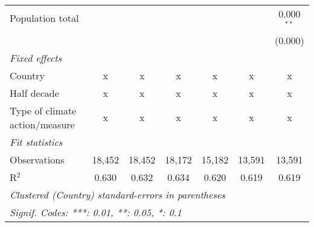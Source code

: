 \begin{tabular}{lcccccc}
   Population total                                  &                &                &                &                &                & 0.000$^{**}$\\   
                                                     &                &                &                &                &                & (0.000)\\   
   \emph{Fixed effects}\\
   Country                                           & x              & x              & x              & x              & x              & x\\  
   Half decade                                       & x              & x              & x              & x              & x              & x\\  
   Type of climate action/measure                    & x              & x              & x              & x              & x              & x\\  
   \midrule \emph{Fit statistics}\\
   Observations                                      & 18,452         & 18,452         & 18,172         & 15,182         & 13,591         & 13,591\\  
   R$^2$                                             & 0.630          & 0.632          & 0.634          & 0.620          & 0.619          & 0.619\\  
   \midrule
   \multicolumn{7}{l}{\emph{Clustered (Country) standard-errors in parentheses}}\\
   \multicolumn{7}{l}{\emph{Signif. Codes: ***: 0.01, **: 0.05, *: 0.1}}\\
\end{tabular}
\par\endgroup


